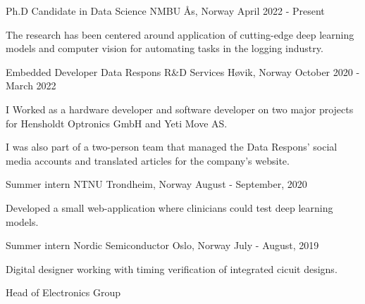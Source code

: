 
\begin{cventries}
    \cventryYJS
        {Ph.D Candidate in Data Science}
        {NMBU}
        {Ås, Norway}
        {April 2022 - Present}
        {\begin{cvitems}
            \item {The research has been centered around application of cutting-edge deep learning models and computer vision for automating tasks in the logging industry.}
        \end{cvitems}}
    \cventryYJS
        {Embedded Developer}
        {Data Respons R\&D Services}
        {Høvik, Norway}
        {October 2020 - March 2022}
        {
        \begin{cvitems}
            \item {I Worked as a hardware developer and software developer on two major projects for Hensholdt Optronics GmbH and Yeti Move AS.}
            \item {I was also part of a two-person team that managed the Data Respons' social media accounts and translated articles for the company's website.}
        \end{cvitems}
        }
    \cventryYJS
        {Summer intern}
        {NTNU}
        {Trondheim, Norway}
        {August - September, 2020}
        {\begin{cvitems}
            \item {Developed a small web-application where clinicians could test deep learning models.}
        \end{cvitems}}
    \cventryYJS
        {Summer intern}
        {Nordic Semiconductor}
        {Oslo, Norway}
        {July - August, 2019}
        {
        \begin{cvitems}
            \item {Digital designer working with timing verification of integrated cicuit designs.}
        \end{cvitems}
        }
    \cventryYJS
        {Head of Electronics Group}

\end{cventries}
